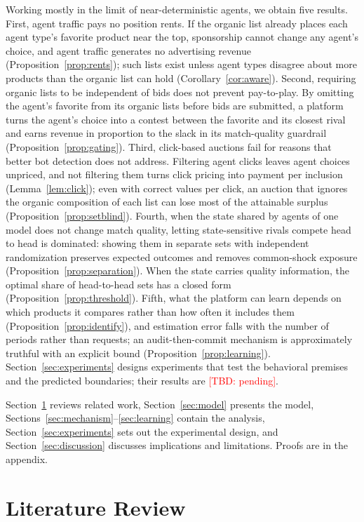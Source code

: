 \documentclass[opre,dblanonrev]{informs4}
\providecommand{\1}{\mathbf{1}}
\providecommand{\TBD}[1]{\textcolor{red}{[TBD: #1]}}
\begin{document}
Working mostly in the limit of near-deterministic agents, we obtain five results. First, agent traffic pays no position rents. If the organic list already places each agent type's favorite product near the top, sponsorship cannot change any agent's choice, and agent traffic generates no advertising revenue (Proposition~\ref{prop:rents}); such lists exist unless agent types disagree about more products than the organic list can hold (Corollary~\ref{cor:aware}). Second, requiring organic lists to be independent of bids does not prevent pay-to-play. By omitting the agent's favorite from its organic lists before bids are submitted, a platform turns the agent's choice into a contest between the favorite and its closest rival and earns revenue in proportion to the slack in its match-quality guardrail (Proposition~\ref{prop:gating}). Third, click-based auctions fail for reasons that better bot detection does not address. Filtering agent clicks leaves agent choices unpriced, and not filtering them turns click pricing into payment per inclusion (Lemma~\ref{lem:click}); even with correct values per click, an auction that ignores the organic composition of each list can lose most of the attainable surplus (Proposition~\ref{prop:setblind}). Fourth, when the state shared by agents of one model does not change match quality, letting state-sensitive rivals compete head to head is dominated: showing them in separate sets with independent randomization preserves expected outcomes and removes common-shock exposure (Proposition~\ref{prop:separation}). When the state carries quality information, the optimal share of head-to-head sets has a closed form (Proposition~\ref{prop:threshold}). Fifth, what the platform can learn depends on which products it compares rather than how often it includes them (Proposition~\ref{prop:identify}), and estimation error falls with the number of periods rather than requests; an audit-then-commit mechanism is approximately truthful with an explicit bound (Proposition~\ref{prop:learning}). Section~\ref{sec:experiments} designs experiments that test the behavioral premises and the predicted boundaries; their results are \TBD{pending}.

Section~\ref{sec:lit} reviews related work, Section~\ref{sec:model} presents the model, Sections~\ref{sec:mechanism}--\ref{sec:learning} contain the analysis, Section~\ref{sec:experiments} sets out the experimental design, and Section~\ref{sec:discussion} discusses implications and limitations. Proofs are in the appendix.


\section{Literature Review}\label{sec:lit}
\end{document}
